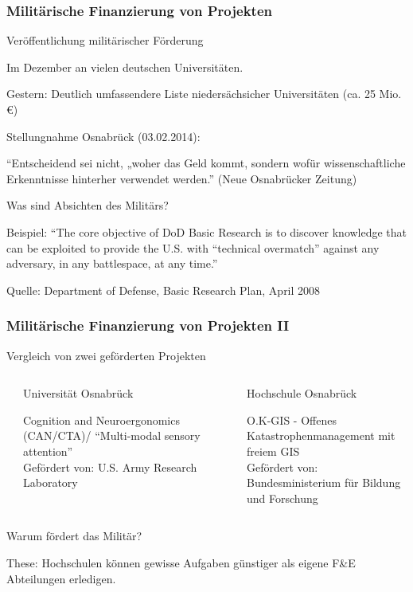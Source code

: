 \documentclass[presentation]{beamer}
\begin{document}
\begin{frame}
\frametitle{Militärische Finanzierung von Projekten}
\label{sec-3-3}
\begin{block}{Veröffentlichung militärischer Förderung}
\label{sec-3-3-1}

\small Im Dezember an vielen deutschen Universitäten.

\small Gestern: Deutlich umfassendere Liste niedersächsicher Universitäten (ca. 25 Mio. €)

\pause
\end{block}
\begin{block}{Stellungnahme Osnabrück (03.02.2014):}
\label{sec-3-3-2}

\small ``Entscheidend sei nicht, „woher das Geld kommt, sondern wofür wissenschaftliche Erkenntnisse hinterher verwendet werden.'' (Neue Osnabrücker Zeitung)

\pause
\end{block}
\begin{block}{Was sind Absichten des Militärs?}
\label{sec-3-3-3}

\small Beispiel: ``The core objective of DoD Basic Research is to discover knowledge that can be exploited to provide the U.S. with ``technical overmatch'' against any adversary, in any battlespace, at any time.''

\tiny Quelle: Department of Defense, Basic Research Plan, April 2008
\end{block}
\end{frame}
\begin{frame}
\frametitle{Militärische Finanzierung von Projekten II}
\label{sec-3-4}


Vergleich von zwei geförderten Projekten
\begin{columns}[t] %
\label{sec-3-4-1}
\begin{column}{0.48\textwidth}
\begin{alertblock}{Universität Osnabrück}
\label{sec-3-4-1-1}

     Cognition and Neuroergonomics (CAN/CTA)/ ``Multi-modal sensory attention''\\[1em]
     
     Gefördert von: U.S. Army Research Laboratory
\end{alertblock}
\end{column}
\begin{column}{0.48\textwidth}
\begin{exampleblock}{Hochschule Osnabrück}
\label{sec-3-4-1-2}

     O.K-GIS - Offenes Katastrophenmanagement mit freiem GIS\\[1em]

     Gefördert von: Bundesministerium für Bildung und Forschung
\end{exampleblock}
\end{column}
\end{columns}
\label{sec-3-4-2}

    Warum fördert das Militär?

    These: Hochschulen können gewisse Aufgaben günstiger als eigene F\&E Abteilungen erledigen.
\end{frame}
\end{document}
